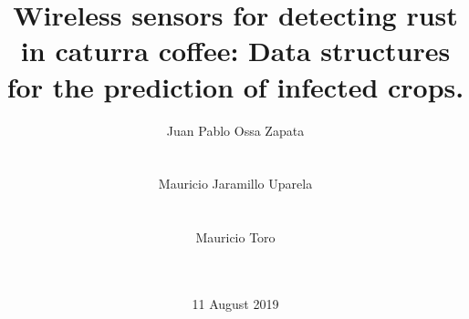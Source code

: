 \documentclass{acm_proc_article-sp}
\begin{document}





\title{Wireless sensors for detecting rust in caturra coffee: Data structures for the prediction of infected crops.}


%
\author{
%
%
\alignauthor
Juan Pablo Ossa Zapata\\
       \\
       \\
\alignauthor
Mauricio Jaramillo Uparela\\
       \\
       \\
\alignauthor
Mauricio Toro\\
        \\
        \\
        }

\date{11 August 2019}
\end{document}
